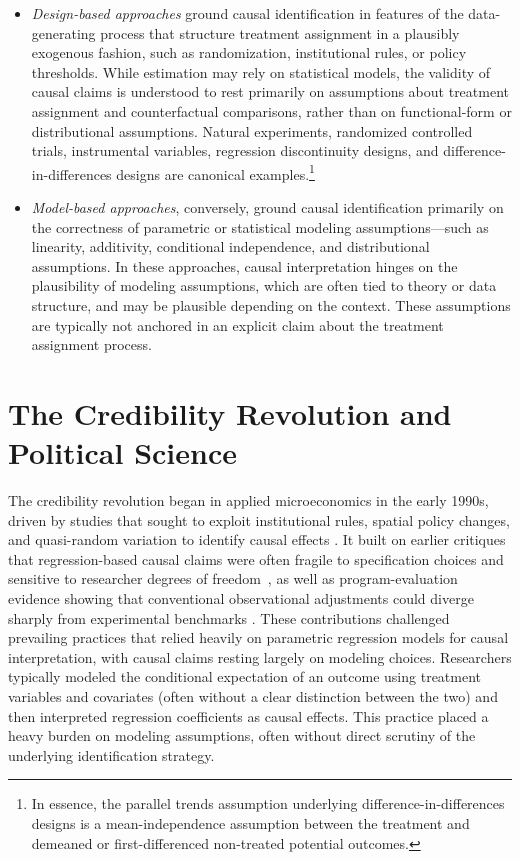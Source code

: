 \documentclass[12pt]{article}
\begin{document}
\begin{itemize}\itemsep0em
\item \emph{Design-based approaches} ground causal identification in features of the data-generating process that structure treatment assignment in a plausibly exogenous fashion, such as randomization, institutional rules, or policy thresholds. While estimation may rely on statistical models, the validity of causal claims is understood to rest primarily on assumptions about treatment assignment and counterfactual comparisons, rather than on functional-form or distributional assumptions. Natural experiments, randomized controlled trials, instrumental variables, regression discontinuity designs, and difference-in-differences designs are canonical examples.\footnote{In essence, the parallel trends assumption underlying difference-in-differences designs is a mean-independence assumption between the treatment and demeaned or first-differenced non-treated potential outcomes.}

\item \emph{Model-based approaches}, conversely, ground causal identification primarily on the correctness of parametric or statistical modeling assumptions---such as linearity, additivity, conditional independence, and distributional assumptions. In these approaches, causal interpretation hinges on the plausibility of modeling assumptions, which are often tied to theory or data structure, and may be plausible depending on the context. These assumptions are typically not anchored in an explicit claim about the treatment assignment process.
\end{itemize}

\section*{The Credibility Revolution and Political Science}\label{sec:ourapproach}

The credibility revolution began in applied microeconomics in the early 1990s, driven by studies that sought to exploit institutional rules, spatial policy changes, and quasi-random variation to identify causal effects \citep[e.g.,][]{angrist1991does,card1994minimumwage}. It built on earlier critiques that regression-based causal claims were often fragile to specification choices and sensitive to researcher degrees of freedom~\citep{leamer1983}, as well as program-evaluation evidence showing that conventional observational adjustments could diverge sharply from experimental benchmarks \citep{lalonde1986}. These contributions challenged prevailing practices that relied heavily on parametric regression models for causal interpretation, with causal claims resting largely on modeling choices. Researchers typically modeled the conditional expectation of an outcome using treatment variables and covariates (often without a clear distinction between the two) and then interpreted regression coefficients as causal effects. This practice placed a heavy burden on modeling assumptions, often without direct scrutiny of the underlying identification strategy.
\end{document}
